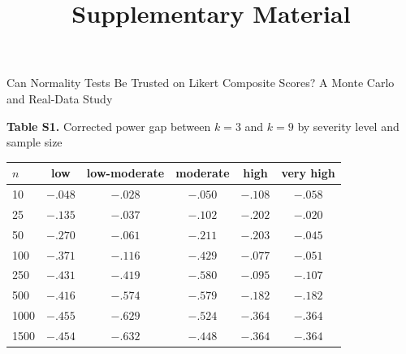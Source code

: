 \documentclass[11pt]{article}
\title{Supplementary Material}
\author{}
\date{}
\begin{document}
\maketitle
\begin{center}\small Can Normality Tests Be Trusted on Likert Composite Scores? A Monte Carlo and Real-Data Study\end{center}

\begin{table}[h]
\centering
\textbf{Table S1.} Corrected power gap between $k=3$ and $k=9$ by severity level and sample size\par\medskip
\small
\begin{tabular}{lccccc}
\toprule
$n$ & low & low-moderate & moderate & high & very high \\
\midrule
10 & $-.048$ & $-.028$ & $-.050$ & $-.108$ & $-.058$ \\
25 & $-.135$ & $-.037$ & $-.102$ & $-.202$ & $-.020$ \\
50 & $-.270$ & $-.061$ & $-.211$ & $-.203$ & $-.045$ \\
100 & $-.371$ & $-.116$ & $-.429$ & $-.077$ & $-.051$ \\
250 & $-.431$ & $-.419$ & $-.580$ & $-.095$ & $-.107$ \\
500 & $-.416$ & $-.574$ & $-.579$ & $-.182$ & $-.182$ \\
1000 & $-.455$ & $-.629$ & $-.524$ & $-.364$ & $-.364$ \\
1500 & $-.454$ & $-.632$ & $-.448$ & $-.364$ & $-.364$ \\
\bottomrule
\end{tabular}
\par{}
\end{table}
\end{document}
